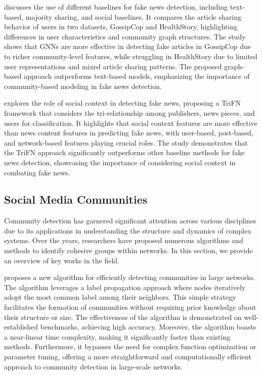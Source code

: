 \documentclass[12pt]{article}
\begin{document}
\cite{chandra2020graphbased} discusses the use of different baselines for fake news detection, including text-based,
majority sharing, and social baselines. It compares the article sharing behavior of users in two datasets,
GossipCop and HealthStory, highlighting differences in user characteristics and community graph structures.
The study shows that GNNs are more effective in detecting fake articles in GossipCop due to richer community-level features,
while struggling in HealthStory due to limited user representations and mixed article sharing patterns.
The proposed graph-based approach outperforms text-based models, emphasizing the importance of community-based modeling in fake news detection.

\cite{shu2018news} explores the role of social context in detecting fake news, proposing a TriFN framework that considers the tri-relationship
among publishers, news pieces, and users for classification. It highlights that social context features are more effective
than news content features in predicting fake news, with user-based, post-based, and network-based features playing crucial roles.
The study demonstrates that the TriFN approach significantly outperforms other baseline methods for fake news detection,
showcasing the importance of considering social context in combating fake news.


\subsection{Social Media Communities}

Community detection has garnered significant attention across various disciplines due to its applications
in understanding the structure and dynamics of complex systems.
Over the years, researchers have proposed numerous algorithms and methods to identify cohesive groups within networks.
In this section, we provide an overview of key works in the field.

\cite{Raghavan_2007} proposes a new algorithm for efficiently detecting communities in large networks.
The algorithm leverages a label propagation approach where nodes iteratively adopt the most
common label among their neighbors. This simple strategy facilitates the formation of communities without
requiring prior knowledge about their structure or size. The effectiveness of the algorithm is demonstrated
on well-established benchmarks, achieving high accuracy. Moreover, the algorithm boasts a near-linear time complexity,
making it significantly faster than existing methods. Furthermore, it bypasses the need for complex function
optimization or parameter tuning, offering a more straightforward and
computationally efficient approach to community detection in large-scale networks.
\end{document}

